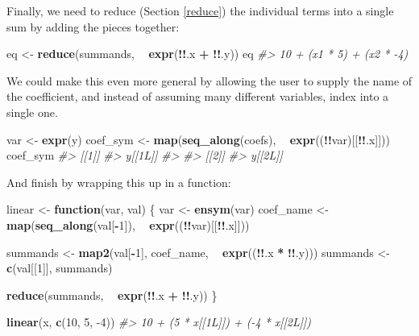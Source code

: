 \documentclass[]{book}
\newenvironment{Shaded}{\begin{snugshade}}{\end{snugshade}}
\newcommand{\CommentTok}[1]{\textcolor[rgb]{0.37,0.37,0.37}{\textit{#1}}}
\newcommand{\ControlFlowTok}[1]{\textcolor[rgb]{0.27,0.27,0.27}{\textbf{#1}}}
\newcommand{\DecValTok}[1]{\textcolor[rgb]{0.06,0.06,0.06}{#1}}
\newcommand{\KeywordTok}[1]{\textcolor[rgb]{0.27,0.27,0.27}{\textbf{#1}}}
\newcommand{\NormalTok}[1]{#1}
\newcommand{\OperatorTok}[1]{\textcolor[rgb]{0.43,0.43,0.43}{\textbf{#1}}}
\newcommand{\StringTok}[1]{\textcolor[rgb]{0.5,0.5,0.5}{#1}}
\begin{document}
Finally, we need to reduce (Section \ref{reduce}) the individual terms into a single sum by adding the pieces together:

\begin{Shaded}
\begin{Highlighting}[]
\NormalTok{eq <-}\StringTok{ }\KeywordTok{reduce}\NormalTok{(summands, }\OperatorTok{~}\StringTok{ }\KeywordTok{expr}\NormalTok{(}\OperatorTok{!!}\NormalTok{.x }\OperatorTok{+}\StringTok{ }\OperatorTok{!!}\NormalTok{.y))}
\NormalTok{eq}
\CommentTok{#> 10 + (x1 * 5) + (x2 * -4)}
\end{Highlighting}
\end{Shaded}

We could make this even more general by allowing the user to supply the name of the coefficient, and instead of assuming many different variables, index into a single one.

\begin{Shaded}
\begin{Highlighting}[]
\NormalTok{var <-}\StringTok{ }\KeywordTok{expr}\NormalTok{(y)}
\NormalTok{coef_sym <-}\StringTok{ }\KeywordTok{map}\NormalTok{(}\KeywordTok{seq_along}\NormalTok{(coefs), }\OperatorTok{~}\StringTok{ }\KeywordTok{expr}\NormalTok{((}\OperatorTok{!!}\NormalTok{var)[[}\OperatorTok{!!}\NormalTok{.x]]))}
\NormalTok{coef_sym}
\CommentTok{#> [[1]]}
\CommentTok{#> y[[1L]]}
\CommentTok{#> }
\CommentTok{#> [[2]]}
\CommentTok{#> y[[2L]]}
\end{Highlighting}
\end{Shaded}

And finish by wrapping this up in a function:

\begin{Shaded}
\begin{Highlighting}[]
\NormalTok{linear <-}\StringTok{ }\ControlFlowTok{function}\NormalTok{(var, val) \{}
\NormalTok{  var <-}\StringTok{ }\KeywordTok{ensym}\NormalTok{(var)}
\NormalTok{  coef_name <-}\StringTok{ }\KeywordTok{map}\NormalTok{(}\KeywordTok{seq_along}\NormalTok{(val[}\OperatorTok{-}\DecValTok{1}\NormalTok{]), }\OperatorTok{~}\StringTok{ }\KeywordTok{expr}\NormalTok{((}\OperatorTok{!!}\NormalTok{var)[[}\OperatorTok{!!}\NormalTok{.x]]))}

\NormalTok{  summands <-}\StringTok{ }\KeywordTok{map2}\NormalTok{(val[}\OperatorTok{-}\DecValTok{1}\NormalTok{], coef_name, }\OperatorTok{~}\StringTok{ }\KeywordTok{expr}\NormalTok{((}\OperatorTok{!!}\NormalTok{.x }\OperatorTok{*}\StringTok{ }\OperatorTok{!!}\NormalTok{.y)))}
\NormalTok{  summands <-}\StringTok{ }\KeywordTok{c}\NormalTok{(val[[}\DecValTok{1}\NormalTok{]], summands)}

  \KeywordTok{reduce}\NormalTok{(summands, }\OperatorTok{~}\StringTok{ }\KeywordTok{expr}\NormalTok{(}\OperatorTok{!!}\NormalTok{.x }\OperatorTok{+}\StringTok{ }\OperatorTok{!!}\NormalTok{.y))}
\NormalTok{\}}

\KeywordTok{linear}\NormalTok{(x, }\KeywordTok{c}\NormalTok{(}\DecValTok{10}\NormalTok{, }\DecValTok{5}\NormalTok{, }\DecValTok{-4}\NormalTok{))}
\CommentTok{#> 10 + (5 * x[[1L]]) + (-4 * x[[2L]])}
\end{Highlighting}
\end{Shaded}
\end{document}
